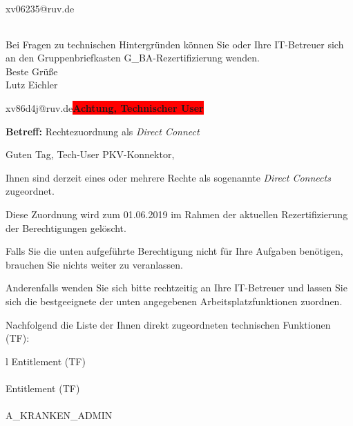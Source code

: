 \documentclass[a4paper,landscape,12pt]{letter}
\begin{document}
\begin{letter}{xv06235@ruv.de\hfill \break}
\begin{tiny}
\begin{longtable}{|p{35mm}|p{15mm}|p{25mm}|p{10mm}|p{40mm}|p{50mm}|p{50mm}|}
\hline
		\end{longtable}
		\end{tiny}
	
\begin{minipage}{\textwidth}
			Bei Fragen zu technischen Hintergründen können Sie 
			oder Ihre IT-Betreuer sich an den Gruppenbriefkasten 
			G\_BA-Rezertifizierung
			wenden.\\
			\linebreak
			Beste Grüße\\
			Lutz Eichler
	\end{minipage}
	\end{letter}
	
\begin{letter}{xv86d4j@ruv.de\space\space\space\space\space\space\space\space\space\bfseries\colorbox{red}{Achtung, Technischer User}\hfill \break}
\begin{normalsize}
	\opening{\textbf{Betreff:} Rechtezuordnung als \emph{Direct Connect}}
	\begin{normalsize} \hfill
	\end{normalsize}

	\begin{normalsize}
		Guten Tag, 
	Tech-User PKV-Konnektor, \hfill \break
	\end{normalsize}
	\end{normalsize}
	
\begin{normalsize}
	Ihnen sind derzeit eines oder mehrere Rechte als sogenannte \emph{Direct Connects} zugeordnet.
	
	Diese Zuordnung wird zum 01.06.2019 im Rahmen der aktuellen Rezertifizierung der Berechtigungen gelöscht.
	
	Falls Sie die unten aufgeführte Berechtigung nicht für Ihre Aufgaben benötigen, 
	brauchen Sie nichts weiter zu veranlassen.
	
	Anderenfalls wenden Sie sich bitte rechtzeitig an Ihre IT-Betreuer 
	und lassen Sie sich die bestgeeignete der unten angegebenen Arbeitsplatzfunktionen zuordnen.
	\end{normalsize}
	
\begin{normalsize}
	Nachfolgend die Liste der Ihnen direkt zugeordneten technischen Funktionen (TF):

	\begin{longtable}{l}
		Entitlement (TF) \\ \hline
		\endfirsthead
		\\\hline
		Entitlement (TF) \\ \hline
		\endhead %
		\multicolumn{1}{r@{}}{Fortsetzung \ldots}\\
		\endfoot
		\hline
		\endlastfoot
	A\_KRANKEN\_ADMIN\\
	\end{longtable}
	\end{normalsize}
	

\end{letter}
\end{document}

